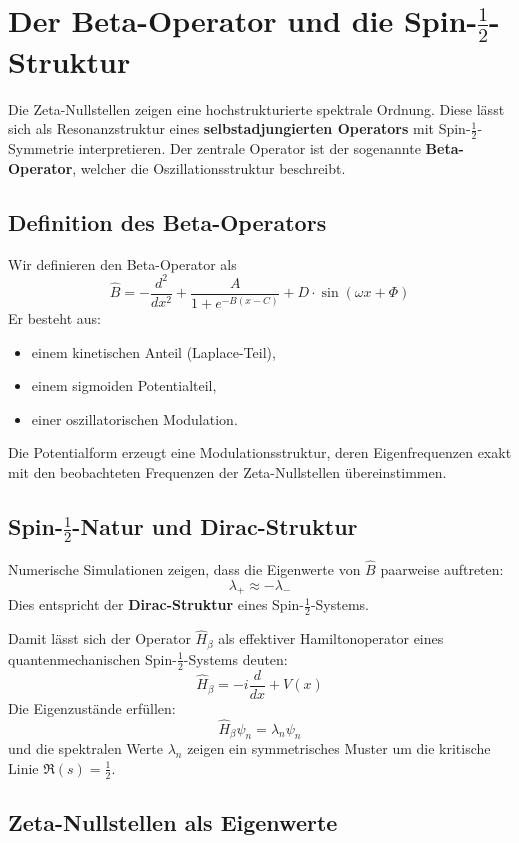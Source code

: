 \section{Der Beta-Operator und die Spin-\texorpdfstring{$\frac{1}{2}$}{1/2}-Struktur}

Die Zeta-Nullstellen zeigen eine hochstrukturierte spektrale Ordnung. Diese lässt sich als Resonanzstruktur eines \textbf{selbstadjungierten Operators} mit Spin-\(\frac{1}{2}\)-Symmetrie interpretieren. Der zentrale Operator ist der sogenannte \textbf{Beta-Operator}, welcher die Oszillationsstruktur beschreibt.

\subsection{Definition des Beta-Operators}

Wir definieren den Beta-Operator als
\[
\hat{B} = -\frac{d^2}{dx^2} + \frac{A}{1 + e^{-B(x - C)}} + D \cdot \sin(\omega x + \Phi)
\]
Er besteht aus:
\begin{itemize}
    \item einem kinetischen Anteil (Laplace-Teil),
    \item einem sigmoiden Potentialteil,
    \item einer oszillatorischen Modulation.
\end{itemize}

Die Potentialform erzeugt eine Modulationsstruktur, deren Eigenfrequenzen exakt mit den beobachteten Frequenzen der Zeta-Nullstellen übereinstimmen.

\subsection{Spin-\texorpdfstring{$\frac{1}{2}$}{1/2}-Natur und Dirac-Struktur}

Numerische Simulationen zeigen, dass die Eigenwerte von \(\hat{B}\) paarweise auftreten:
\[
\lambda_{+} \approx -\lambda_{-}
\]
Dies entspricht der \textbf{Dirac-Struktur} eines Spin-\(\frac{1}{2}\)-Systems.

Damit lässt sich der Operator \(\hat{H}_\beta\) als effektiver Hamiltonoperator eines quantenmechanischen Spin-\(\frac{1}{2}\)-Systems deuten:
\[
\hat{H}_\beta = -i \frac{d}{dx} + V(x)
\]
Die Eigenzustände erfüllen:
\[
\hat{H}_\beta \psi_n = \lambda_n \psi_n
\]
und die spektralen Werte \(\lambda_n\) zeigen ein symmetrisches Muster um die kritische Linie \( \Re(s) = \frac{1}{2} \).

\subsection{Zeta-Nullstellen als Eigenwerte}

